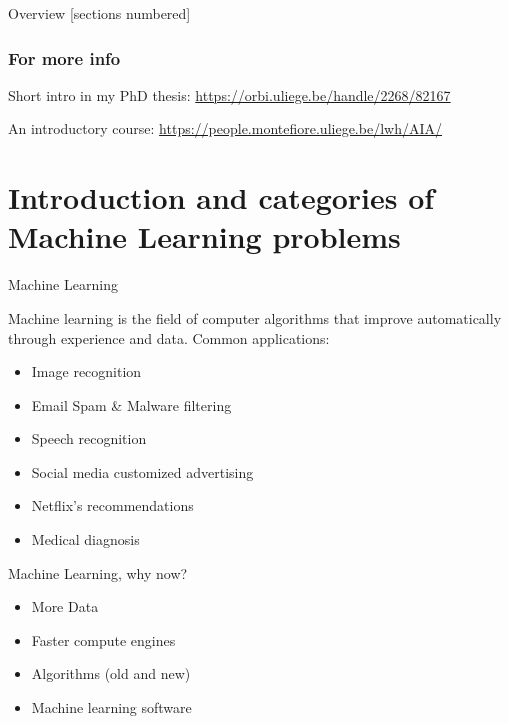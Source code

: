 \titleframe

\begin{frame}{Overview}
  [sections numbered]
  \tableofcontents[hideallsubsections]
\end{frame}


\begin{frame}
  \frametitle{For more info}

Short intro in my PhD thesis: \url{https://orbi.uliege.be/handle/2268/82167}

An introductory course: \url{https://people.montefiore.uliege.be/lwh/AIA/}


\end{frame}
\section{Introduction and categories of Machine Learning problems}
\begin{frame}{Machine Learning}
  
  Machine learning is the field of computer algorithms that improve automatically through experience and data.
  Common applications:
      \begin{itemize}
        \item Image recognition
        \item Email Spam \& Malware filtering
        \item Speech recognition
        \item Social media customized advertising
        \item Netflix's recommendations
        \item Medical diagnosis
      \end{itemize}
\end{frame}

\begin{frame}{Machine Learning, why now?}
      \begin{itemize}
        \item More Data
        \item Faster compute engines
        \item Algorithms (old and new)
        \item Machine learning software
      \end{itemize}
  
\end{frame}


